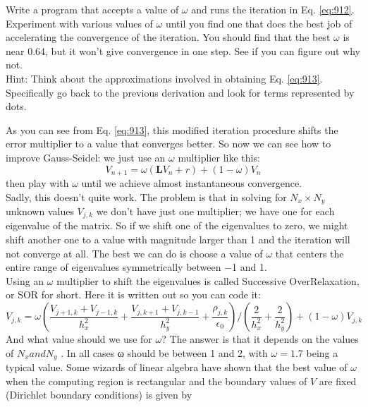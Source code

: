 \begin{problem}\label{P9.4} Write a program that accepts a value of $\omega$ and runs the iteration in Eq. \ref{eq:912}.
Experiment with various values of $\omega$ until you find one that does the best
job of accelerating the convergence of the iteration. You should find that
the best $\omega$ is near 0.64, but it won’t give convergence in one step. See if you
can figure out why not.\\
Hint: Think about the approximations involved in obtaining Eq. \ref{eq:913}. Specifically go back to the previous derivation and look for terms represented by dots.\\
\end{problem}
As you can see from Eq. \ref{eq:913}, this modified iteration procedure shifts the
error multiplier to a value that converges better. So now we can see how to
improve Gauss-Seidel: we just use an $\omega$ multiplier like this:
\begin{equation}\label{eq:914}
V_{n+1}=\omega\left(\mathbf{L} V_{n}+r\right)+(1-\omega) V_{n}
\end{equation}
then play with $\omega$ until we achieve almost instantaneous convergence. \\ 
Sadly, this doesn\rq t quite work. The problem is that in solving for $N_x × N_y$
unknown values $V_{j,k}$ we don\rq t have just one multiplier; we have one for each
eigenvalue of the matrix. So if we shift one of the eigenvalues to zero, we might
shift another one to a value with magnitude larger than 1 and the iteration will
not converge at all. The best we can do is choose a value of $\omega$ that centers the
entire range of eigenvalues symmetrically between −1 and 1. \\ 
Using an $\omega$ multiplier to shift the eigenvalues is called Successive OverRelaxation, or SOR for short. Here it is written out so you can code it:
\begin{equation}\label{eq:915}
V_{j, k}=\omega\left(\frac{V_{j+1, k}+V_{j-1, k}}{h_{x}^{2}}+\frac{V_{j, k+1}+V_{j, k-1}}{h_{y}^{2}}+\frac{\rho_{j, k}}{\epsilon_{0}}\right) /\left(\frac{2}{h_{x}^{2}}+\frac{2}{h_{y}^{2}}\right)+(1-\omega) V_{j, k}
\end{equation}
And what value should we use for $\omega$? The answer is that it depends on the values
of $N_x and N_y$ . In all cases ω should be between 1 and 2, with $\omega = 1.7$ being a
typical value. Some wizards of linear algebra have shown that the best value of $\omega$ when the computing region is rectangular and the boundary values of $V$ are fixed (Dirichlet boundary conditions) is given by
